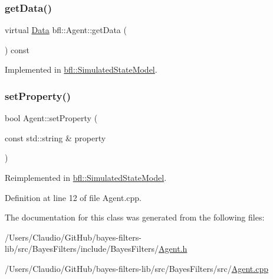 \subsubsection{\texorpdfstring{get\+Data()}{getData()}}
{\footnotesize\ttfamily virtual \mbox{\hyperlink{namespacebfl_af6b103c6821db1b54452f776fdd9dd02}{Data}} bfl\+::\+Agent\+::get\+Data (\begin{DoxyParamCaption}{ }\end{DoxyParamCaption}) const\hspace{0.3cm}{\ttfamily [pure virtual]}}



Implemented in \mbox{\hyperlink{classbfl_1_1SimulatedStateModel_a23aa6df27179a9a48b48cf4002508ba9}{bfl\+::\+Simulated\+State\+Model}}.

\mbox{\label{classbfl_1_1Agent_a1291dcb438c8fc1400e1728711302007}} 
\subsubsection{\texorpdfstring{set\+Property()}{setProperty()}}
{\footnotesize\ttfamily bool Agent\+::set\+Property (\begin{DoxyParamCaption}\item[{const std\+::string \&}]{property }\end{DoxyParamCaption})\hspace{0.3cm}{\ttfamily [virtual]}}



Reimplemented in \mbox{\hyperlink{classbfl_1_1SimulatedStateModel_ab629cfc5e8db969760f5fa161a1cf360}{bfl\+::\+Simulated\+State\+Model}}.



Definition at line 12 of file Agent.\+cpp.



The documentation for this class was generated from the following files\+:\begin{DoxyCompactItemize}
\item 
/\+Users/\+Claudio/\+Git\+Hub/bayes-\/filters-\/lib/src/\+Bayes\+Filters/include/\+Bayes\+Filters/\mbox{\hyperlink{Agent_8h}{Agent.\+h}}\item 
/\+Users/\+Claudio/\+Git\+Hub/bayes-\/filters-\/lib/src/\+Bayes\+Filters/src/\mbox{\hyperlink{Agent_8cpp}{Agent.\+cpp}}\end{DoxyCompactItemize}
